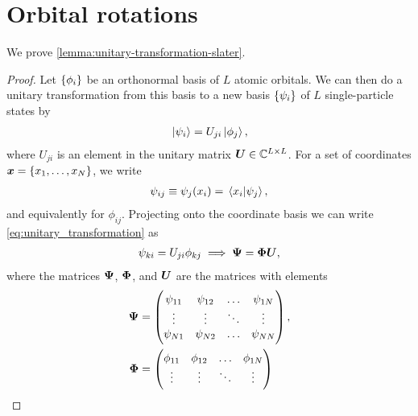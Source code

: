     \section{Orbital rotations}
        \label{sec:orbital-rotations}
        We prove \autoref{lemma:unitary-transformation-slater}.
        \begin{proof}
            Let $\left\{ \phi_i \right\}$ be an orthonormal basis of $L$
            atomic orbitals.
            We can then do a unitary transformation from this basis to a new
            basis $\left\{ \psi_i \right\}$ of $L$ single-particle states by
            \begin{align}
                \ket*{\psi_i} = U_{ji}\ket*{\phi_j},
                \label{eq:unitary_transformation}
            \end{align}
            where $U_{ji}$ is an element in the unitary matrix $\boldsymbol{U} \in
            \mathbb{C}^{L \times L}$.
            For a set of coordinates $\boldsymbol{x} = \left\{ x_1, \dots, x_N \right\}$, we
            write
            \begin{align}
                \psi_{ij} \equiv \psi_j(x_i)
                = \braket*{x_i}{\psi_j},
            \end{align}
            and equivalently for $\phi_{ij}$. Projecting onto the coordinate
            basis we can write \autoref{eq:unitary_transformation} as
            \begin{gather}
                \psi_{ki} = U_{ji}\phi_{kj}
                \implies
                \boldsymbol{\Psi} = \boldsymbol{\Phi}\boldsymbol{U},
            \end{gather}
            where the matrices $\boldsymbol{\Psi}$, $\boldsymbol{\Phi}$, and $\boldsymbol{U}$ are
            the matrices with elements
            \begin{align}
                \boldsymbol{\Psi}
                &= \begin{pmatrix}
                    \psi_{11} & \psi_{12} & \dots & \psi_{1N} \\
                    \vdots & \vdots & \ddots & \vdots \\
                    \psi_{N1} & \psi_{N2} & \dots & \psi_{NN}
                \end{pmatrix}, \\
                \boldsymbol{\Phi}
                &= \begin{pmatrix}
                    \phi_{11} & \phi_{12} & \dots & \phi_{1N} \\
                    \vdots & \vdots & \ddots & \vdots \\

\end{pmatrix}
\end{align}
\end{proof}
